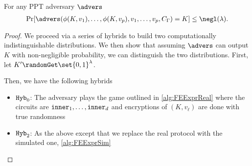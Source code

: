 \begin{lemma}
	\label{lemma:hardLearnK}
	For any PPT adversary $\advers$
	\begin{align}
		\label{eq:Kindist}
		\Pr[\advers(\phi(K, v_1), \dots, \phi(K, v_p), v_1, \dots, v_p, \circNeigb) = K]
			\leq \negl(\lambda). \notag
	\end{align}
	\begin{proof}
		We proceed via a series of hybrids to build two computationally indistinguishable distributions.
		We then show that assuming $\advers$ can output $K$ with non-negligible probability, we can distinguish the two distributions.
		First, let $K' \randomGet \set{0, 1}^\lambda$.
		
		Then, we have the following hybrids
		\begin{itemize}
			\item $\texttt{Hyb}_0$: The adversary plays the game outlined in \cref{alg:FEExprReal} where the circuits are $\texttt{inner}_1, \dots, \texttt{inner}_d$
			and encryptions of $(K, v_\ell)$ are done with true randomness
			\item $\texttt{Hyb}_2$: As the above except that we replace the real protocol with the simulated one, \cref{alg:FEExprSim}


\end{itemize}
\end{proof}
\end{lemma}
